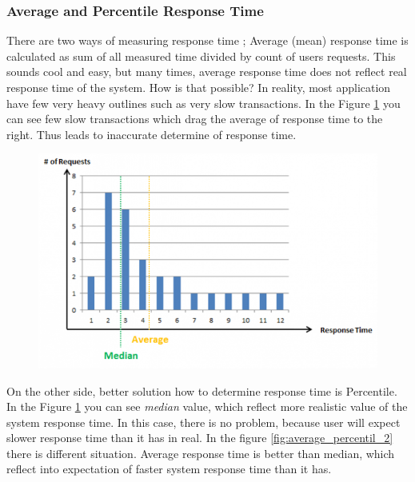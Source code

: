 \subsubsection*{Average and Percentile Response Time}
There are two ways of measuring response time \cite{Kopp:RPT}; Average (mean) response time is calculated as sum of all measured time divided by count of users requests. This sounds cool and easy, but many times, average response time does not reflect real response time of the system. How is that possible? In reality, most application have few very heavy outlines such as very slow transactions. In the Figure \ref{fig:average_percentil_1} you can see few slow transactions which drag the average of response time to the right. Thus leads to inaccurate determine of response time.


\begin{figure}[H]
  \centering
  \includegraphics[width=15cm]{obrazky-figures/average_vs_percentile_1.png}
  \caption{}
  \label{fig:average_percentil_1}
\end{figure}

On the other side, better solution how to determine response time is Percentile. In the Figure \ref{fig:average_percentil_1} you can see \emph{median} value, which reflect more realistic value of the system response time. In this case, there is no problem, because user will expect slower response time than it has in real. In the figure \ref{fig:average_percentil_2} there is different situation. Average response time is better than median, which reflect into expectation of faster system response time than it has.

